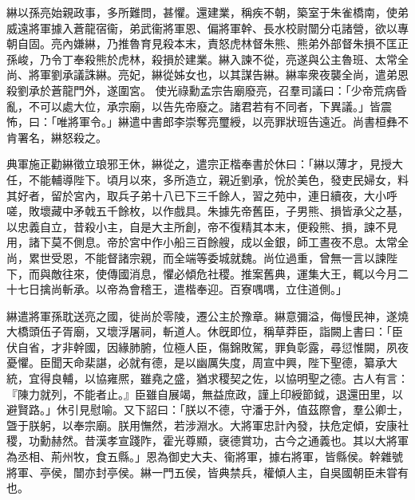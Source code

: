 \begin{pinyinscope}
 
綝以孫亮始親政事，多所難問，甚懼。還建業，稱疾不朝，築室于朱雀橋南，使弟威遠將軍據入蒼龍宿衞，弟武衞將軍恩、偏將軍幹、長水校尉闓分屯諸營，欲以專朝自固。亮內嫌綝，乃推魯育見殺本末，責怒虎林督朱熊、熊弟外部督朱損不匡正孫峻，乃令丁奉殺熊於虎林，殺損於建業。綝入諫不從，亮遂與公主魯班、太常全尚、將軍劉承議誅綝。亮妃，綝從姊女也，以其謀告綝。綝率衆夜襲全尚，遣弟恩殺劉承於蒼龍門外，遂圍宮。
 使光祿勳孟宗告廟廢亮，召羣司議曰：「少帝荒病昏亂，不可以處大位，承宗廟，以告先帝廢之。諸君若有不同者，下異議。」皆震怖，曰：「唯將軍令。」綝遣中書郎李崇奪亮璽綬，以亮罪狀班告遠近。尚書桓彝不肯署名，綝怒殺之。
 
 
 
 
 典軍施正勸綝徵立琅邪王休，綝從之，遣宗正楷奉書於休曰：「綝以薄才，見授大任，不能輔導陛下。頃月以來，多所造立，親近劉承，恱於美色，發吏民婦女，料其好者，留於宮內，取兵子弟十八已下三千餘人，習之苑中，連日續夜，大小呼嗟，敗壞藏中矛戟五千餘枚，以作戲具。朱據先帝舊臣，子男熊、損皆承父之基，以忠義自立，昔殺小主，自是大主所創，帝不復精其本末，便殺熊、損，諫不見用，諸下莫不側息。帝於宮中作小船三百餘艘，成以金銀，師工晝夜不息。太常全尚，累世受恩，不能督諸宗親，而全端等委城就魏。尚位過重，曾無一言以諫陛下，而與敵往來，使傳國消息，懼必傾危社稷。推案舊典，運集大王，輒以今月二十七日擒尚斬承。以帝為會稽王，遣楷奉迎。百寮喁喁，立住道側。」
 
 
 
 
 綝遣將軍孫耽送亮之國，徙尚於零陵，遷公主於豫章。綝意彌溢，侮慢民神，遂燒大橋頭伍子胥廟，又壞浮屠祠，斬道人。休旣即位，稱草莽臣，詣闕上書曰：「臣伏自省，才非幹國，因緣肺腑，位極人臣，傷錦敗駕，罪負彰露，尋愆惟闕，夙夜憂懼。臣聞天命棐諶，必就有德，是以幽厲失度，周宣中興，陛下聖德，纂承大統，宜得良輔，以協雍熈，雖堯之盛，猶求稷契之佐，以協明聖之德。古人有言：『陳力就列，不能者止。』臣雖自展竭，無益庶政，謹上印綬節鉞，退還田里，以避賢路。」休引見慰喻。又下詔曰：「朕以不德，守潘于外，值茲際會，羣公卿士，曁于朕躬，以奉宗廟。朕用憮然，若涉淵水。大將軍忠計內發，扶危定傾，安康社稷，功勳赫然。昔漢孝宣踐阼，霍光尊顯，襃德賞功，古今之通義也。其以大將軍為丞相、荊州牧，食五縣。」恩為御史大夫、衞將軍，據右將軍，皆縣侯。幹雜號將軍、亭侯，闓亦封亭侯。綝一門五侯，皆典禁兵，權傾人主，自吳國朝臣未甞有也。
 

\end{pinyinscope}
